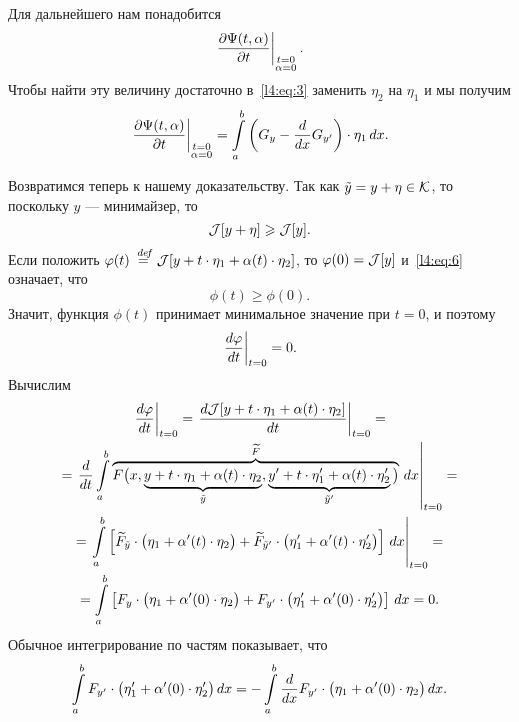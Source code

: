 Для дальнейшего нам понадобится
\begin{equation*}
	\left.\frac{\partial\Psi(t,\alpha)}{\partial t}\right|_{\substack{t=0\\\alpha=0}}.
\end{equation*}
Чтобы найти эту величину достаточно в~\eqref{l4:eq:3} заменить $\eta_2$ на $\eta_1$ и мы получим 
\begin{equation}
	\label{l4:eq:5}
	\left.\frac{\partial\Psi(t,\alpha)}{\partial t}\right|_{\substack{t=0\\\alpha=0}}=\int\limits_a^b\left(G_y-\frac{d}{dx}G_{y'}\right)\cdot\eta_1\,dx.
\end{equation}

Возвратимся теперь к нашему доказательству. Так как $\tilde{y}=y+\eta\in\mathcal{K}$, то поскольку $y$ --- минимайзер, то 
\begin{equation}
	\label{l4:eq:6}
	\mathcal{J}[y+\eta]\geqslant\mathcal{J}[y].
\end{equation} 
Если положить $\varphi(t)\stackrel{\hspace{0.09 cm}de\!f}{=}\mathcal{J}[y+t\cdot\eta_1+\alpha(t)\cdot\eta_2]$, то $\varphi(0)=\mathcal{J}[y]$ и~\eqref{l4:eq:6} означает, что 
\begin{equation}
	\label{l4:eq:7}
	\phi(t)\geqslant\phi(0).
\end{equation} 
Значит, функция $\phi(t)$ принимает минимальное значение при $t=0$, и поэтому 
\begin{equation}
	\label{l4:eq:8}
	\left.\frac{d\varphi}{dt}\right|_{t=0}=0.
\end{equation} 
Вычислим
\begin{multline}
	\label{l4:eq:9}
	\left.\frac{d\varphi}{dt}\right|_{t=0}=\left.\frac{d\mathcal{J}[y+t\cdot\eta_1+\alpha(t)\cdot\eta_2]}{dt}\right|_{t=0}=\\=\left.\frac{d}{dt}\int\limits_a^b \overbrace{F\big(x,\underbrace{y+t\cdot\eta_1+\alpha(t)\cdot\eta_2}_{\tilde{y}},\underbrace{y'+t\cdot\eta'_1+\alpha(t)\cdot\eta'_2}_{\tilde{y}'}\big)}^{\widetilde{F}}\,dx\right|_{t=0}=\\
	=\left.\int\limits_a^b\left[\widetilde{F}_{\tilde{y}}\cdot\big(\eta_1+\alpha'(t)\cdot\eta_2\big)+\widetilde{F}_{\tilde{y}'}\cdot\big(\eta'_1+\alpha'(t)\cdot\eta'_2\big)\right]\,dx\right|_{t=0}=\\
	=\int\limits_a^b\left[{F}_{{y}}\cdot\big(\eta_1+\alpha'(0)\cdot\eta_2\big)+{F}_{y'}\cdot\big(\eta'_1+\alpha'(0)\cdot\eta'_2\big)\right]\,dx=0.
\end{multline}
Обычное интегрирование по частям показывает, что
\begin{equation}
	\label{l4:eq:10}
	\int\limits_a^b F_{y'}\cdot\big(\eta'_1+\alpha'(0)\cdot\eta'_2\big)\,dx=-\int\limits_a^b\frac{d}{dx}F_{y'}\cdot\big(\eta_1+\alpha'(0)\cdot\eta_2\big)\,dx.
\end{equation}

